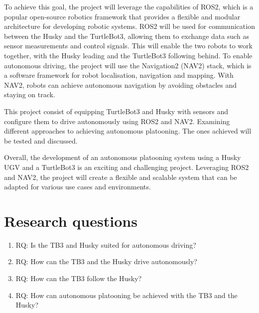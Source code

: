 To achieve this goal, the project will leverage the capabilities of ROS2, which is a popular open-source robotics framework that provides a flexible and modular architecture for developing robotic systems. ROS2 will be used for communication between the Husky and the TurtleBot3, allowing them to exchange data such as sensor measurements and control signals. This will enable the two robots to work together, with the Husky leading and the TurtleBot3 following behind.
To enable autonomous driving, the project will use the Navigation2 (NAV2) stack, which is a software framework for robot localisation, navigation and mapping. With NAV2, robots can achieve autonomous navigation by avoiding obstacles and staying on track.

This project consist of equipping TurtleBot3 and Husky with sensors and configure them to drive autonomously using ROS2 and NAV2. Examining different approaches to achieving autonomous platooning. The ones achieved will be tested and discussed.  

Overall, the development of an autonomous platooning system using a Husky UGV and a TurtleBot3 is an exciting and challenging project. Leveraging ROS2 and NAV2, the project will create a flexible and scalable system that can be adapted for various use cases and environments.

\section{Research questions}

\begin{enumerate}
    \item RQ: Is the TB3 and Husky suited for autonomous driving? 

    \item RQ: How can the TB3 and the Husky drive autonomously?
 
    \item RQ: How can the TB3 follow the Husky? 

    \item RQ: How can autonomous platooning be achieved with the TB3 and the Husky? 
\end{enumerate}
